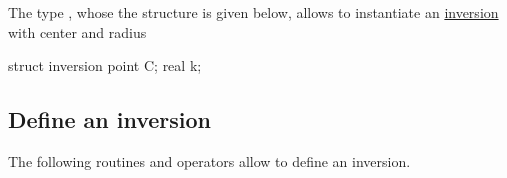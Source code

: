 \documentclass[pdftex]{article}
\begin{document}
The type , whose the structure is given below,
allows to instantiate an
\href{http://mathworld.wolfram.com/Inversion.htm}{inversion}
with center  and radius 
\begin{center}
  \begin{Vcolor}
    struct inversion
    {
      point C;
      real k;
    }
  \end{Vcolor}
\end{center}
\subsection{Define an inversion}
The following routines and operators allow to define an inversion.
\end{document}
